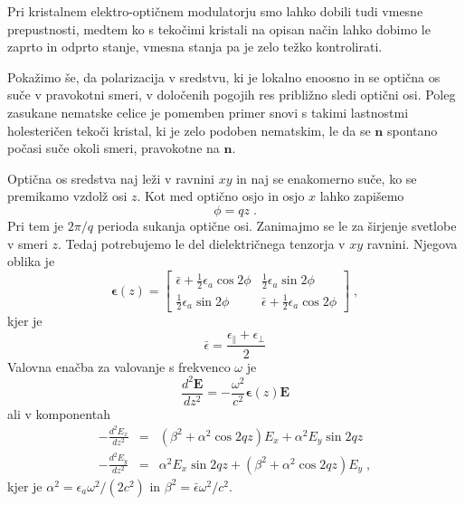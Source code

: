 Pri kristalnem elektro-optičnem modulatorju smo lahko dobili tudi vmesne
prepustnosti, medtem ko s tekočimi kristali na opisan način lahko
dobimo le zaprto in odprto stanje, vmesna stanja pa je zelo težko
kontrolirati.

Pokažimo še, da polarizacija v sredstvu, ki je lokalno enoosno in
se optična os suče v pravokotni smeri, v določenih pogojih res približno
sledi optični osi. Poleg zasukane nematske celice je pomemben primer
snovi s takimi lastnostmi holesteričen tekoči kristal, ki je zelo
podoben nematskim, le da se $\mathbf{n}$ spontano počasi suče okoli
smeri, pravokotne na $\mathbf{n}$.

Optična os sredstva naj leži v ravnini $xy$ in naj se enakomerno
suče, ko se premikamo vzdolž osi $z$. Kot med optično osjo in osjo
$x$ lahko zapišemo 
\begin{equation}
\phi=qz\;.\label{7.58}
\end{equation}
 Pri tem je $2\pi/q$ perioda sukanja optične osi. Zanimajmo se le
za širjenje svetlobe v smeri $z$. Tedaj potrebujemo le del dielektričnega
tenzorja v $xy$ ravnini. Njegova oblika je 
\begin{equation}
\boldsymbol{\epsilon}(z)=\left[\begin{array}{cc}
\bar{\epsilon}+\frac{1}{2}\epsilon_{a}\cos2\phi & \frac{1}{2}\epsilon_{a}\sin2\phi\\
\frac{1}{2}\epsilon_{a}\sin2\phi & \bar{\epsilon}+\frac{1}{2}\epsilon_{a}\cos2\phi
\end{array}\right]\;,\label{7.59}
\end{equation}
 kjer je 
\begin{equation}
\bar{\epsilon}=\frac{\epsilon_{\parallel}+\epsilon_{\perp}}{2}\label{7.60}
\end{equation}
 Valovna enačba za valovanje s frekvenco $\omega$ je 
\begin{equation}
\frac{d^{2}\mathbf{E}}{dz^{2}}=-\frac{\omega^{2}}{c^{2}}\boldsymbol{\epsilon}(z)\mathbf{E}\label{7.61}
\end{equation}
 ali v komponentah 
\begin{eqnarray}
-\frac{d^{2}E_{x}}{dz^{2}} & = & (\beta^{2}+\alpha^{2}\cos2qz)E_{x}+\alpha^{2}E_{y}\sin2qz\nonumber \\
-\frac{d^{2}E_{y}}{dz^{2}} & = & \alpha^{2}E_{x}\sin2qz+(\beta^{2}+\alpha^{2}\cos2qz)E_{y}\;,
\end{eqnarray}
 kjer je $\alpha^{2}=\epsilon_{a}\omega^{2}/(2c^{2})$ in $\beta^{2}=\bar{\epsilon}\omega^{2}/c^{2}$.

